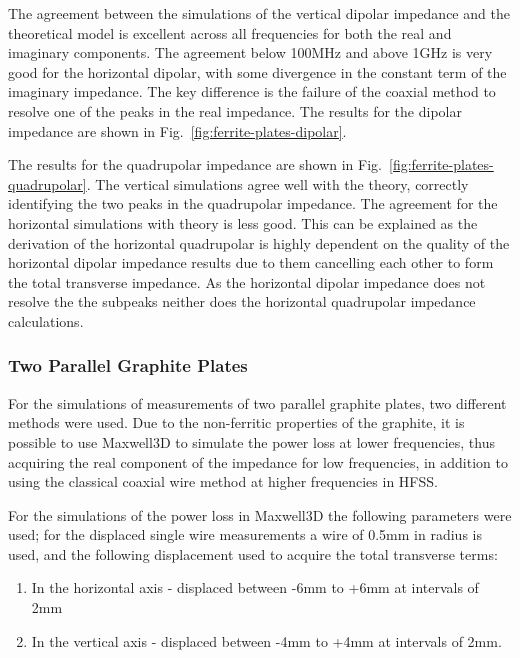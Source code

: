 The agreement between the simulations of the vertical dipolar impedance and the theoretical model is excellent across all frequencies for both the real and imaginary components. The agreement below 100MHz and above 1GHz is very good for the horizontal dipolar, with some divergence in the constant term of the imaginary impedance. The key difference is the failure of the coaxial method to resolve one of the peaks in the real impedance. The results for the dipolar impedance are shown in Fig.~\ref{fig:ferrite-plates-dipolar}.

The results for the quadrupolar impedance are shown in Fig.~\ref{fig:ferrite-plates-quadrupolar}. The vertical simulations agree well with the theory, correctly identifying the two peaks in the quadrupolar impedance. The agreement for the horizontal simulations with theory is less good. This can be explained as the derivation of the horizontal quadrupolar is highly dependent on the quality of the horizontal dipolar impedance results due to them cancelling each other to form the total transverse impedance. As the horizontal dipolar impedance does not resolve the the subpeaks neither does the horizontal quadrupolar impedance calculations.

\subsubsection{Two Parallel Graphite Plates}

For the simulations of measurements of two parallel graphite plates, two different methods were used. Due to the non-ferritic properties of the graphite, it is possible to use Maxwell3D to simulate the power loss at lower frequencies, thus acquiring the real component of the impedance for low frequencies, in addition to using the classical coaxial wire method at higher frequencies in HFSS.

For the simulations of the power loss in Maxwell3D the following parameters were used; for the displaced single wire measurements a wire of 0.5mm in radius is used, and the following displacement used to acquire the total transverse terms:

\begin{enumerate}
\item{In the horizontal axis -  displaced between -6mm to +6mm at intervals of 2mm}
\item{In the vertical axis - displaced between -4mm to +4mm at intervals of 2mm.}
\end{enumerate}


